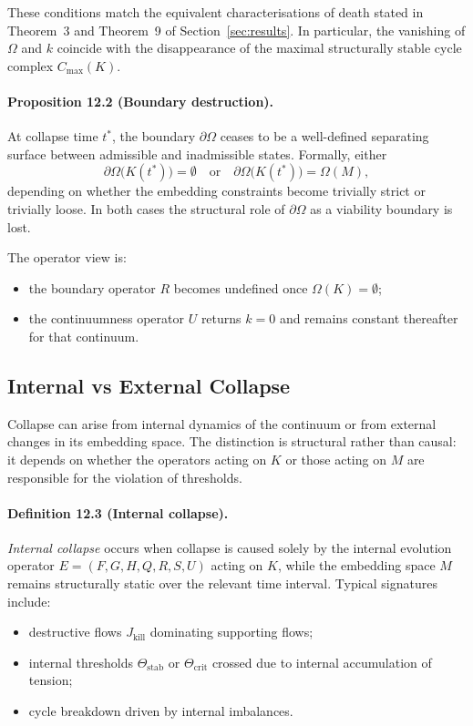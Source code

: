 These conditions match the equivalent characterisations of death stated in
Theorem~3 and Theorem~9 of Section~\ref{sec:results}.
In particular, the vanishing of \(\Omega\) and \(k\) coincide with the
disappearance of the maximal structurally stable cycle complex
\(C_{\max}(K)\).

\paragraph{Proposition 12.2 (Boundary destruction).}
At collapse time \(t^{\ast}\), the boundary \(\partial\Omega\) ceases to be a
well-defined separating surface between admissible and inadmissible states.
Formally, either
\begin{equation}
  \partial\Omega\big(K(t^{\ast})\big) = \emptyset
  \quad\text{or}\quad
  \partial\Omega\big(K(t^{\ast})\big) = \Omega(M),
\end{equation}
depending on whether the embedding constraints become trivially strict or
trivially loose. In both cases the structural role of \(\partial\Omega\)
as a viability boundary is lost.

The operator view is:
\begin{itemize}
  \item the boundary operator \(R\) becomes undefined once
        \(\Omega(K)=\emptyset\);
  \item the continuumness operator \(U\) returns \(k=0\) and remains
        constant thereafter for that continuum.
\end{itemize}

\subsection{Internal vs External Collapse}

Collapse can arise from internal dynamics of the continuum or from external
changes in its embedding space. The distinction is structural rather than
causal: it depends on whether the operators acting on \(K\) or those acting on
\(M\) are responsible for the violation of thresholds.

\paragraph{Definition 12.3 (Internal collapse).}
\emph{Internal collapse} occurs when collapse is caused solely by the internal
evolution operator \(E=(F,G,H,Q,R,S,U)\) acting on \(K\), while the embedding
space \(M\) remains structurally static over the relevant time interval.
Typical signatures include:
\begin{itemize}
  \item destructive flows \(J_{\mathrm{kill}}\) dominating supporting flows;
  \item internal thresholds \(\Theta_{\mathrm{stab}}\) or
        \(\Theta_{\mathrm{crit}}\) crossed due to internal accumulation of
        tension;
  \item cycle breakdown driven by internal imbalances.
\end{itemize}

